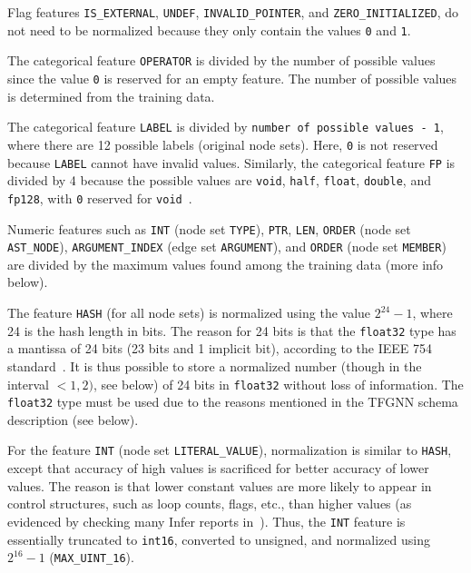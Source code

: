 Flag features \texttt{IS\_EXTERNAL}, \texttt{UNDEF}, \texttt{INVALID\_POINTER}, and \texttt{ZERO\_INITIALIZED}, do not need to be normalized because they only contain the values \texttt{0} and \texttt{1}.

The categorical feature \texttt{OPERATOR} is divided by the number of possible values since the value \texttt{0} is reserved for an empty feature. The number of possible values is determined from the training data.

The categorical feature \texttt{LABEL} is divided by \texttt{number of possible values - 1}, where there are 12 possible labels (original node sets). Here, \texttt{0} is not reserved because \texttt{LABEL} cannot have invalid values. Similarly, the categorical feature \texttt{FP} is divided by 4 because the possible values are \texttt{void}, \texttt{half}, \texttt{float}, \texttt{double}, and \texttt{fp128}, with \texttt{0} reserved for \texttt{void}~\cite{LLVM-IR}.

Numeric features such as \texttt{INT} (node set \texttt{TYPE}), \texttt{PTR}, \texttt{LEN}, \texttt{ORDER} (node set \texttt{AST\_NODE}), \texttt{ARGUMENT\_INDEX} (edge set \texttt{ARGUMENT}), and \texttt{ORDER} (node set \texttt{MEMBER}) are divided by the maximum values found among the training data (more info below).

The feature \texttt{HASH} (for all node sets) is normalized using the value $2^{24}-1$, where 24 is the hash length in bits. The reason for 24 bits is that the \texttt{float32} type has a mantissa of 24 bits (23 bits and 1 implicit bit), according to the IEEE 754 standard~\cite{ieee-floating-point}. It is thus possible to store a normalized number (though in the interval $<1, 2)$, see below) of 24 bits in \texttt{float32} without loss of information. The \texttt{float32} type must be used due to the reasons mentioned in the TFGNN schema description (see below).

For the feature \texttt{INT} (node set \texttt{LITERAL\_VALUE}), normalization is similar to \texttt{HASH}, except that accuracy of high values is sacrificed for better accuracy of lower values. The reason is that lower constant values are more likely to appear in control structures, such as loop counts, flags, etc., than higher values (as evidenced by checking many Infer reports in~\cite{bc}). Thus, the \texttt{INT} feature is essentially truncated to \texttt{int16}, converted to unsigned, and normalized using $2^{16}-1$ (\texttt{MAX\_UINT\_16}).

